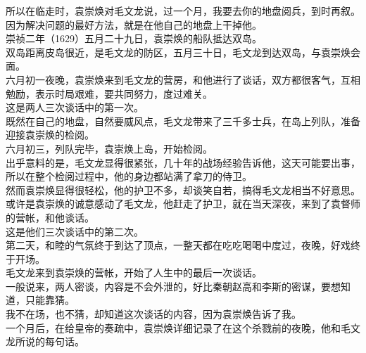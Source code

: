 \begin{multicols}{\theparacolNo}
所以在临走时，袁崇焕对毛文龙说，过一个月，我要去你的地盘阅兵，到时再叙。\\

因为解决问题的最好方法，就是在他自己的地盘上干掉他。\\

崇祯二年（1629）五月二十九日，袁崇焕的船队抵达双岛。\\

双岛距离皮岛很近，是毛文龙的防区，五月三十日，毛文龙到达双岛，与袁崇焕会面。\\

六月初一夜晚，袁崇焕来到毛文龙的营房，和他进行了谈话，双方都很客气，互相勉励，表示时局艰难，要共同努力，度过难关。\\

这是两人三次谈话中的第一次。\\

既然在自己的地盘，自然要威风点，毛文龙带来了三千多士兵，在岛上列队，准备迎接袁崇焕的检阅。\\

六月初三，列队完毕，袁崇焕上岛，开始检阅。\\

出乎意料的是，毛文龙显得很紧张，几十年的战场经验告诉他，这天可能要出事，所以在整个检阅过程中，他的身边都站满了拿刀的侍卫。\\

然而袁崇焕显得很轻松，他的护卫不多，却谈笑自若，搞得毛文龙相当不好意思。\\

或许是袁崇焕的诚意感动了毛文龙，他赶走了护卫，就在当天深夜，来到了袁督师的营帐，和他谈话。\\

这是他们三次谈话中的第二次。\\

第二天，和睦的气氛终于到达了顶点，一整天都在吃吃喝喝中度过，夜晚，好戏终于开场。\\

毛文龙来到袁崇焕的营帐，开始了人生中的最后一次谈话。\\

一般说来，两人密谈，内容是不会外泄的，好比秦朝赵高和李斯的密谋，要想知道，只能靠猜。\\

我不在场，也不猜，却知道这次谈话的内容，因为袁崇焕告诉了我。\\

一个月后，在给皇帝的奏疏中，袁崇焕详细记录了在这个杀戮前的夜晚，他和毛文龙所说的每句话。\\


\end{multicols}

